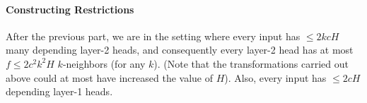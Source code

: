 \documentclass[11pt,a4paper]{article}
\begin{document}





\paragraph{Constructing Restrictions}
After the previous part, we are in the setting where every input has $\leq 2kcH$ many depending layer-2 heads, and consequently every layer-2 head has at most $f \leq 2c^2k^2H$ $k$-neighbors (for any $k$).
(Note that the transformations carried out above could at most have increased the value of $H$).
Also, every input has $\leq 2cH$ depending layer-1 heads.

\end{document}
